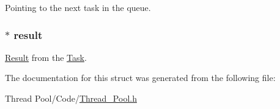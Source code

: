 Pointing to the next task in the queue. 

\hypertarget{struct_task_a47963d2c7f557db21790fb71b8cd20d6}{}
\subsubsection[{result}]{$\ast$ result}\label{struct_task_a47963d2c7f557db21790fb71b8cd20d6}


\hyperlink{struct_result}{Result} from the \hyperlink{struct_task}{Task}. 



The documentation for this struct was generated from the following file\+:\begin{DoxyCompactItemize}
\item 
Thread Pool/\+Code/\hyperlink{_thread___pool_8h}{Thread\+\_\+\+Pool.\+h}\end{DoxyCompactItemize}
